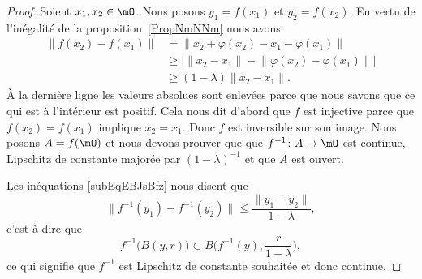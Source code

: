 \begin{proof}
    Soient \( x_1,x_2\in\mO\). Nous posons \( y_1=f(x_1)\) et \( y_2=f(x_2)\). En vertu de l'inégalité de la proposition~\ref{PropNmNNm} nous avons
    \begin{subequations}      \label{subEqEBJsBfz}
        \begin{align}
            \big\| f(x_2)-f(x_1) \big\| &   =   \big\| x_2+\varphi(x_2)-x_1-\varphi(x_1) \big\|                         \\
                                        & \geq  \Big| \| x_2-x_1 \|-\big\| \varphi(x_2)-\varphi(x_1) \big\| \Big|       \\
                                        & \geq  (1-\lambda)\| x_2-x_1 \|.
        \end{align}
    \end{subequations}
    À la dernière ligne les valeurs absolues sont enlevées parce que nous savons que ce qui est à l'intérieur est positif. Cela nous dit d'abord que \( f\) est injective parce que \( f(x_2)=f(x_1)\) implique \( x_2=x_1\). Donc \( f\) est inversible sur son image. Nous posons \( A=f(\mO)\) et nous devons prouver que que \( f^{-1}\colon A\to \mO\) est continue, Lipschitz de constante majorée par \( (1-\lambda)^{-1}\) et que \( A\) est ouvert.

    Les inéquations \eqref{subEqEBJsBfz} nous disent que
    \begin{equation}
        \big\| f^{-1}(y_1)-f^{-1}(y_2) \big\|\leq \frac{ \| y_1-y_2 \| }{ 1-\lambda },
    \end{equation}
    c'est-à-dire que
    \begin{equation}
        f^{-1}\big( B(y,r) \big)\subset B\big( f^{-1}(y),\frac{ r }{ 1-\lambda } \big),
    \end{equation}
    ce qui signifie que \( f^{-1}\) est Lipschitz de constante souhaitée et donc continue.


\end{proof}
